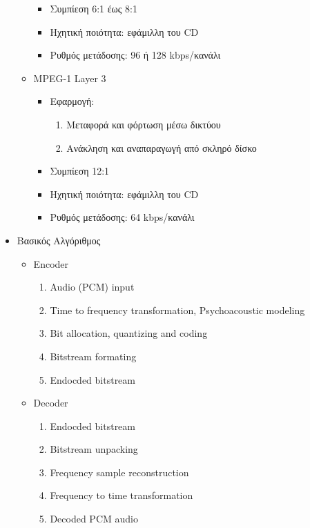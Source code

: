 \documentclass[a4paper,12pt]{article}
\begin{document}
\begin{itemize}
\begin{itemize}
\begin{itemize}
\begin{enumerate}
            \end{enumerate}
            \item Συμπίεση 6:1 έως 8:1
            \item Ηχητική ποιότητα: εφάμιλλη του CD
            \item Ρυθμός μετάδοσης: 96 ή 128 kbps/κανάλι
        \end{itemize}
        \item MPEG-1 Layer 3
        \begin{itemize}
            \item Εφαρμογή:
            \begin{enumerate}
                \item Μεταφορά και φόρτωση μέσω δικτύου
                \item Ανάκληση και αναπαραγωγή από σκληρό δίσκο
            \end{enumerate}
            \item Συμπίεση 12:1
            \item Ηχητική ποιότητα: εφάμιλλη του CD
            \item Ρυθμός μετάδοσης: 64 kbps/κανάλι
        \end{itemize}
    \end{itemize}
    \item Βασικός Αλγόριθμος
    \begin{itemize}
        \item Encoder
        \begin{enumerate}
            \item Audio (PCM) input
            \item Time to frequency transformation, Psychoacoustic modeling
            \item Bit allocation, quantizing and coding
            \item Bitstream formating
            \item Endocded bitstream
        \end{enumerate}
        \item Decoder
        \begin{enumerate}
            \item Endocded bitstream
            \item Bitstream unpacking
            \item Frequency sample reconstruction
            \item Frequency to time transformation
            \item Decoded PCM audio

\end{enumerate}
\end{itemize}
\end{itemize}
\end{document}
